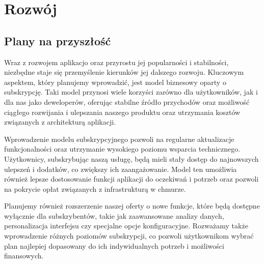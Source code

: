\section{Rozwój}

\subsection{Plany na przyszłość}
Wraz z rozwojem aplikacjo oraz przyrostu jej popularności i stabilności, niezbędne staje się przemyślenie kierunków jej dalszego rozwoju. Kluczowym aspektem, który planujemy wprowadzić, jest model biznesowy oparty o subskrypcję. Taki model przynosi wiele korzyści zarówno dla użytkowników, jak i dla nas jako deweloperów, oferując stabilne źródło przychodów oraz możliwość ciągłego rozwijania i ulepszania naszego produktu oraz utrzymania kosztów związanych z architekturą aplikacji.

Wprowadzenie modelu subskrypcyjnego pozwoli na regularne aktualizacje funkcjonalności oraz utrzymanie wysokiego poziomu wsparcia technicznego. Użytkownicy, subskrybując naszą usługę, będą mieli stały dostęp do najnowszych ulepszeń i dodatków, co zwiększy ich zaangażowanie. Model ten umożliwia również lepsze dostosowanie funkcji aplikacji do oczekiwań i potrzeb oraz pozwoli na pokrycie opłat związanych z infrastrukturą w chmurze.

Planujemy również rozszerzenie naszej oferty o nowe funkcje, które będą dostępne wyłącznie dla subskrybentów, takie jak zaawansowane analizy danych, personalizacja interfejsu czy specjalne opcje konfiguracyjne. Rozważamy także wprowadzenie różnych poziomów subskrypcji, co pozwoli użytkownikom wybrać plan najlepiej dopasowany do ich indywidualnych potrzeb i możliwości finansowych.